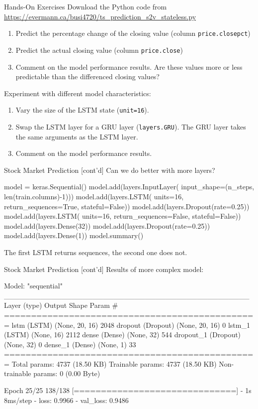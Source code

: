 \documentclass[ignorenonframetext,xcolor=x11names]{beamer}
\begin{document}
\begin{frame}{Hands-On Exercises}
\small
Download the Python code from \url{https://evermann.ca/busi4720/ts_prediction_s2v_stateless.py}

\begin{enumerate}
   \item Predict the percentage change of the closing value (column \texttt{price.closepct})
   \item Predict the actual closing value (column \texttt{price.close})
   \item Comment on the model performance results. Are these values more or less predictable than the differenced closing values?
\end{enumerate}

Experiment with different model characteristics:
\begin{enumerate}
    \item Vary the size of the LSTM state (\texttt{unit=16}).
    \item Swap the LSTM layer for a GRU layer (\texttt{layers.GRU}). The GRU layer takes the same arguments as the LSTM layer.
    \item Comment on the model performance results.
\end{enumerate}
\end{frame}

\begin{frame}[fragile]{Stock Market Prediction \small [cont'd]}
Can we do better with more layers?
\begin{pythoncode}
model = keras.Sequential()
model.add(layers.InputLayer(
    input_shape=(n_steps, len(train.columns)-1)))
model.add(layers.LSTM(
    units=16,
    return_sequences=True,
    stateful=False))
model.add(layers.Dropout(rate=0.25))
model.add(layers.LSTM(
    units=16,
    return_sequences=False,
    stateful=False))
model.add(layers.Dense(32))
model.add(layers.Dropout(rate=0.25))
model.add(layers.Dense(1))
model.summary()
\end{pythoncode}
The first LSTM returns sequences, the second one does not.
\end{frame}

\begin{frame}[fragile]{Stock Market Prediction \small [cont'd]}
Results of more complex model:
\begin{textcode}
Model: "sequential"
_______________________________________________
 Layer (type)         Output Shape      Param #   
===============================================
 lstm (LSTM)          (None, 20, 16)    2048      
 dropout (Dropout)    (None, 20, 16)    0         
 lstm_1 (LSTM)        (None, 16)        2112      
 dense (Dense)        (None, 32)        544       
 dropout_1 (Dropout)  (None, 32)        0         
 dense_1 (Dense)      (None, 1)         33        
===============================================
Total params: 4737 (18.50 KB)
Trainable params: 4737 (18.50 KB)
Non-trainable params: 0 (0.00 Byte)

Epoch 25/25
138/138 [==============================] - 1s 8ms/step 
- loss: 0.9966 - val_loss: 0.9486
\end{textcode}
\end{frame}
\end{document}
